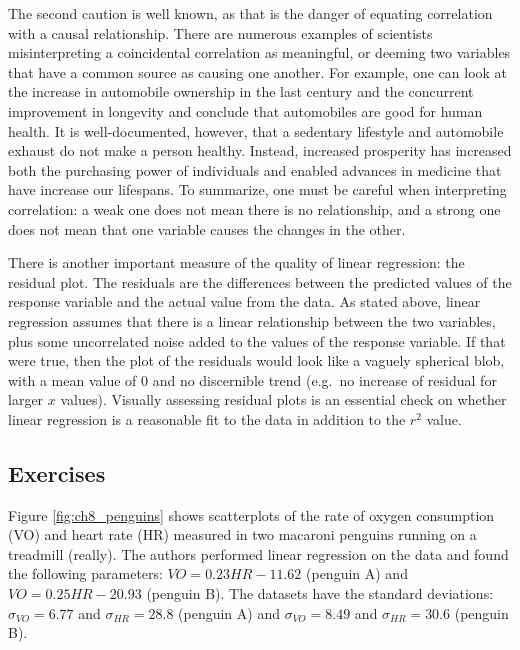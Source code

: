 \documentclass[
  letterpaper,
  DIV=11,
  numbers=noendperiod]{scrreprt}
\begin{document}
The second caution is well known, as that is the danger of equating
correlation with a causal relationship. There are numerous examples of
scientists misinterpreting a coincidental correlation as meaningful, or
deeming two variables that have a common source as causing one another.
For example, one can look at the increase in automobile ownership in the
last century and the concurrent improvement in longevity and conclude
that automobiles are good for human health. It is well-documented,
however, that a sedentary lifestyle and automobile exhaust do not make a
person healthy. Instead, increased prosperity has increased both the
purchasing power of individuals and enabled advances in medicine that
have increase our lifespans. To summarize, one must be careful when
interpreting correlation: a weak one does not mean there is no
relationship, and a strong one does not mean that one variable causes
the changes in the other.

There is another important measure of the quality of linear regression:
the  residual
plot. The residuals are the differences between the predicted values of
the response variable and the actual value from the data. As stated
above, linear regression assumes that there is a linear relationship
between the two variables, plus some uncorrelated noise added to the
values of the response variable. If that were true, then the plot of the
residuals would look like a vaguely spherical blob, with a mean value of
0 and no discernible trend (e.g.~no increase of residual for larger
\(x\) values). Visually assessing residual plots is an essential check
on whether linear regression is a reasonable fit to the data in addition
to the \(r^2\) value.

\hypertarget{exercises-12}{%
\subsection{Exercises}\label{exercises-12}}

Figure \ref{fig:ch8_penguins} shows scatterplots of the rate of oxygen
consumption (VO) and heart rate (HR) measured in two macaroni penguins
running on a treadmill (really). The authors performed linear regression
on the data and found the following parameters: \(VO =0.23HR - 11.62\)
(penguin A) and \(VO =0.25HR - 20.93\) (penguin B). The datasets have
the standard deviations: \(\sigma_{VO} = 6.77\) and
\(\sigma_{HR} = 28.8\) (penguin A) and \(\sigma_{VO} = 8.49\) and
\(\sigma_{HR} = 30.6\) (penguin B).
\end{document}
